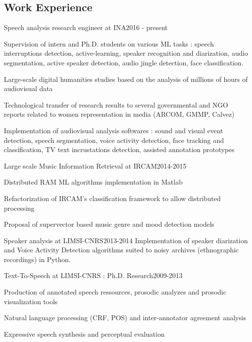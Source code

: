 \begin{en}
\section{Work Experience}



\begin{joblong}{Speech analysis research engineer at INA}{2016 - present}
\item Supervision of intern and Ph.D. students on various ML tasks : speech interruptions detection, active-learning, speaker recognition and diarization, audio segmentation, active speaker detection, audio jingle detection, face classification.
\item Large-scale digital humanities studies based on the analysis of millions of hours of audiovisual data
\item Technological transfer of research results to several governmental and NGO reports related to women representation in media (ARCOM, GMMP, Calvez)
\item Implementation of audiovisual analysis softwares : sound and visual event detection, speech segmentation, voice activity detection, face tracking and classification, TV text incrustations detection, assisted annotation prototypes
\end{joblong}


\begin{joblong}{Large scale Music Information Retrieval at IRCAM}{2014-2015}
\item Distributed RAM ML algorithms implementation in Matlab
\item Refactorization of IRCAM’s classification framework to allow distributed processing
\item Proposal of supervector based music genre and mood detection models
\end{joblong}



\begin{jobshort}{Speaker analysis at LIMSI-CNRS}{2013-2014}
Implementation of speaker diarization and Voice Activity Detection algorithms suited to noisy archives (ethnographic recordings) in Python.
\end{jobshort}



\begin{joblong}{Text-To-Speech at LIMSI-CNRS : Ph.D. Research}{2009-2013}
\item Production of annotated speech ressources, prosodic analyzes and prosodic visualization tools
\item Natural language processing (CRF, POS) and inter-annotator agreement analysis
\item Expressive speech synthesis and perceptual evaluation
\end{joblong}




\end{en}
